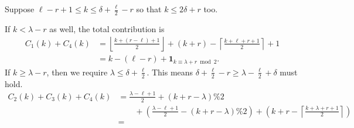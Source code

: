 \begin{itemize}
  \ii Suppose $\ell - r + 1 \le k \le \delta + \frac{\ell}{2} - r$
  so that $k \le 2 \delta + r$ too.
  \begin{itemize}
    \ii If $k < \lambda - r$ as well, the total contribution is
    \begin{align*}
      C_1(k) + C_4(k)
      &= \left\lfloor \frac{k + (r - \ell) + 1}{2} \right\rfloor
      + (k + r) - \left\lceil \frac{k+\ell+r+1}{2} \right\rceil + 1 \\
      &= k - (\ell-r) + \mathbf{1}_{k \equiv \lambda + r \bmod 2}.
    \end{align*}
    \ii If $k \ge \lambda - r$,
    then we require $\lambda \le \delta + \frac{\ell}{2}$.
    This means $\delta + \frac{\ell}{2} - r \ge \lambda - \frac{\ell}{2} + \delta$ must hold.
    \begin{align*}
      C_2(k) + C_3(k) + C_4(k)
      &= \frac{\lambda-\ell+1}{2} + (k+r-\lambda) \% 2 \\
      &\qquad + \left( \frac{\lambda-\ell+1}{2} - (k+r-\lambda)\%2 \right)
        + \left( k + r - \left\lceil \frac{k+\lambda+r+1}{2} \right\rceil \right) \\
      &=
    \end{align*}

  \end{itemize}
\end{itemize}

